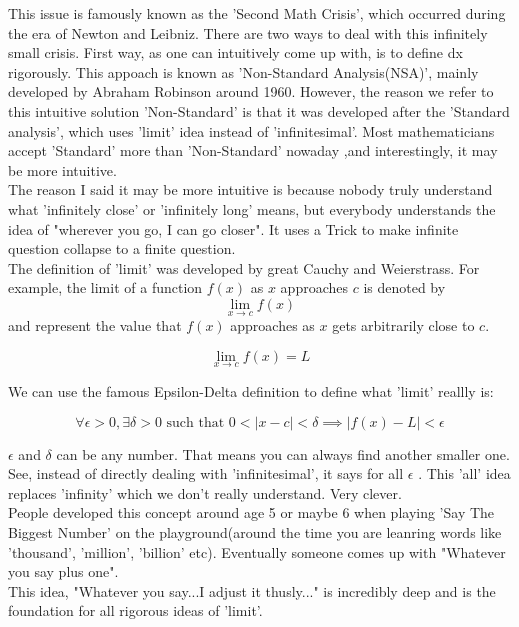 \documentclass{article}
\begin{document}
  This issue is famously known as the 'Second Math Crisis', which occurred during the era of Newton and Leibniz. There are two ways to deal with this infinitely small crisis. First way, as one can intuitively come up with, is to define dx rigorously. This appoach is known as 'Non-Standard Analysis(NSA)', mainly developed by Abraham Robinson around 1960. However, the reason we refer to this intuitive solution 'Non-Standard' is that it was developed after the 'Standard analysis', which uses 'limit' idea instead of 'infinitesimal'. Most mathematicians accept 'Standard' more than 'Non-Standard' nowaday ,and interestingly, it may be more intuitive. \\

  The reason I said it may be more intuitive is because nobody truly understand what 'infinitely close' or 'infinitely long' means, but everybody understands the idea of "wherever you go, I can go closer". It uses a Trick to make infinite question collapse to a finite question. \\

  The definition of 'limit' was developed by great Cauchy and Weierstrass. For example, the limit of a function $f(x)$ as $x$ approaches $c$ is denoted by \[\lim_{x \to c} f(x)\] and represent the value that $f(x)$ approaches as $x$ gets arbitrarily close to $c$. 

  \[\lim_{x \to c} f(x) = L\]

  We can use the famous Epsilon-Delta definition to define what 'limit' reallly is:

  \[\forall \epsilon > 0, \exists \delta > 0 \text { such that } 0 < |x -c| < \delta \implies |f(x) - L| < \epsilon\]

  $\epsilon$ and $\delta$ can be any number. That means you can always find another smaller one. See, instead of directly dealing with 'infinitesimal', it says for all $\epsilon$ . This 'all' idea replaces 'infinity' which we don't really understand. Very clever. \\

  People developed this concept around age 5 or maybe 6 when playing 'Say The Biggest Number' on the playground(around the time you are leanring words like 'thousand', 'million', 'billion' etc). Eventually someone comes up with "Whatever you say plus one". \\

  This idea, "Whatever you say...I adjust it thusly..." is incredibly deep and is the foundation for all rigorous ideas of 'limit'.  \\
\end{document}
